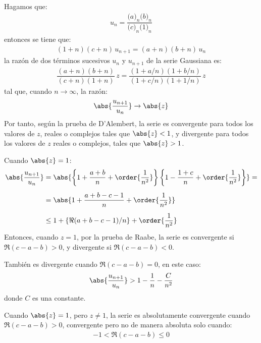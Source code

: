 Hagamos que:
\begin{align*}
u_{n} = \dfrac{\big( a \big)_{n} \big( b \big)_{n}}{\big( c \big)_{n} \big( 1 \big)_{n}}
\end{align*}
entonces se tiene que:
\begin{align}
(1 + n)(c + n) \, u_{n+1} = (a + n)(b +  n) \, u_{n}
\label{eq:ecuacion_01_01_01_12}
\end{align}
la razón de dos términos sucesivos $u_{n}$ y $u_{n+1}$ de la serie Gaussiana es:
\begin{align}
\dfrac{(a + n)(b +  n)}{(c + n)(1 +  n)} \, z = \dfrac{(1 + a/n)(1 + b/n)}{(1 + c/n)(1 + 1/n)} \, z
\label{eq:ecuacion_01_01_01_13}
\end{align}
tal que, cuando $n \to \infty$, la razón:
\begin{align*}
\abs{\dfrac{u_{n+1}}{u_{n}}} \to \abs{z}
\end{align*}
Por tanto, según la prueba de D'Alembert, la serie es convergente para todos los valores de $z$, reales o complejos tales que $\abs{z} < 1$, y divergente para todos los valores de $z$ reales o complejos, tales que $\abs{z} > 1$.
\par
Cuando $\abs{z} = 1$:
\begin{align}
\begin{aligned}[b]
\abs{\dfrac{u_{n+1}}{u_{n}}} &= \abs{\left\{ 1 + \dfrac{a + b}{n} + \order{\dfrac{1}{n^{2}}} \right\} \left\{ 1 - \dfrac{1 + c}{n} + \order{\dfrac{1}{n^{2}}} \right\}} = \\[0.5em]
&= \abs{1 + \dfrac{a + b - c - 1}{n} + \order{\dfrac{1}{n^{2}}}} \\[0.5em]
&\leq 1 + \left\{ \Re (a + b - c - 1) / n \right\} + \order{\dfrac{1}{n^{2}}}
\end{aligned}
\label{eq:eq:ecuacion_01_01_01_14}
\end{align}
Entonces, cuando $z = 1$, por la prueba de Raabe, la serie es convergente si $\Re (c - a - b) > 0$, y divergente si $\Re (c - a - b) < 0$.
\par
También es divergente cuando $\Re (c - a - b) = 0$, en este caso:
\begin{align*}
\abs{\dfrac{u_{n+1}}{u_{n}}} > 1 - \dfrac{1}{n} - \dfrac{C}{n^{2}}
\end{align*}
donde $C$ es una constante.
\par
Cuando $\abs{z} = 1$, pero $z \neq 1$, la serie es absolutamente convergente cuando $\Re (c - a - b) > 0$, convergente pero no de manera absoluta solo cuando:
\begin{align*}
- 1 < \Re (c - a - b) \leq 0
\end{align*}
